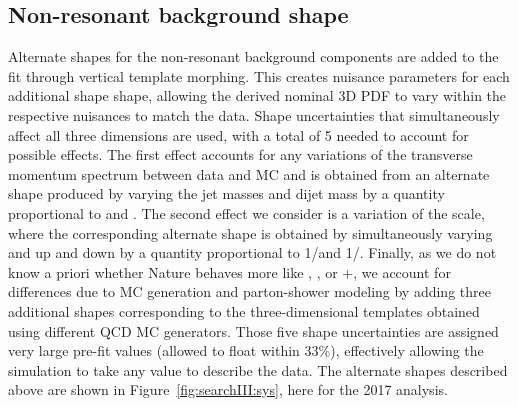 \subsection{Non-resonant background shape}
Alternate shapes for the non-resonant background components are added to the fit through vertical template morphing. This creates nuisance parameters for each additional shape shape, allowing the derived nominal 3D PDF to vary within the respective nuisances to match the data. Shape uncertainties that simultaneously affect all three dimensions are used, with a total of 5 needed to account for possible effects. The first effect accounts for any variations of the transverse momentum spectrum between data and MC and is obtained from an alternate shape produced by varying the jet masses \MJ and dijet mass \MVV by a quantity proportional to \MJ and \MVV. The second effect we consider is a variation of the scale, where the corresponding alternate shape is obtained by simultaneously varying \MJ and \MVV up and down by a quantity proportional to 1/\MVV and 1/\MJ.
Finally, as we do not know a priori whether Nature behaves more like , \HERWIG{++}, or \MADGRAPH{}+, we account for differences due to MC generation and parton-shower modeling by adding three additional shapes corresponding to the three-dimensional templates obtained using different QCD MC generators. Those five shape uncertainties are assigned very large pre-fit values (allowed to float within 33\%), effectively allowing the simulation to take any value to describe the data. The alternate shapes described above are shown in Figure~\ref{fig:searchIII:sys}, here for the 2017 analysis.
